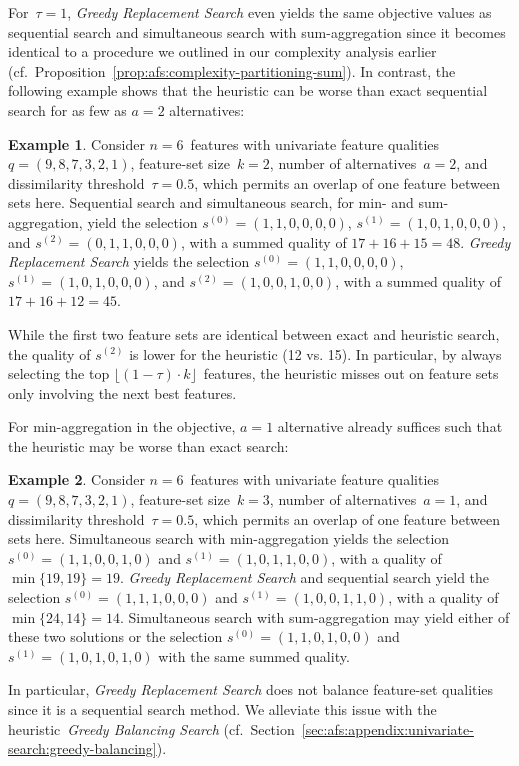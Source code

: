 \documentclass{article}
\theoremstyle{definition}
\newtheorem{example}{Example}
\begin{document}
%
For~$\tau = 1$, \emph{Greedy Replacement Search} even yields the same objective values as sequential search and simultaneous search with sum-aggregation since it becomes identical to a procedure we outlined in our complexity analysis earlier (cf.~Proposition~\ref{prop:afs:complexity-partitioning-sum}).
In contrast, the following example shows that the heuristic can be worse than exact sequential search for as few as $a=2$ alternatives:
%
\begin{example}
Consider $n=6$~features with univariate feature qualities $q = (9,8,7,3,2,1)$, feature-set size~$k=2$, number of alternatives~$a=2$, and dissimilarity threshold~$\tau = 0.5$, which permits an overlap of one feature between sets here.
Sequential search and simultaneous search, for min- and sum-aggregation, yield the selection $s^{(0)} = (1,1,0,0,0,0)$, $s^{(1)} = (1,0,1,0,0,0)$, and $s^{(2)} = (0,1,1,0,0,0)$, with a summed quality of $17+16+15=48$.
\emph{Greedy Replacement Search} yields the selection $s^{(0)} = (1,1,0,0,0,0)$, $s^{(1)} = (1,0,1,0,0,0)$, and $s^{(2)} = (1,0,0,1,0,0)$, with a summed quality of $17+16+12=45$.
\label{ex:afs:greedy-replacement:worse-than-sum-agg}
\end{example}
%
While the first two feature sets are identical between exact and heuristic search, the quality of $s^{(2)}$ is lower for the heuristic (12 vs. 15).
In particular, by always selecting the top $\lfloor (1 - \tau) \cdot k \rfloor$~features, the heuristic misses out on feature sets only involving the next best features.

For min-aggregation in the objective, $a=1$ alternative already suffices such that the heuristic may be worse than exact search:
%
\begin{example}
Consider $n=6$~features with univariate feature qualities $q = (9,8,7,3,2,1)$, feature-set size~$k=3$, number of alternatives~$a=1$, and dissimilarity threshold~$\tau = 0.5$, which permits an overlap of one feature between sets here.
Simultaneous search with min-aggregation yields the selection $s^{(0)} = (1,1,0,0,1,0)$ and $s^{(1)} = (1,0,1,1,0,0)$, with a quality of $\min \{19,19\} = 19$.
\emph{Greedy Replacement Search} and sequential search yield the selection $s^{(0)} = (1,1,1,0,0,0)$ and $s^{(1)} = (1,0,0,1,1,0)$, with a quality of $\min \{24,14\} = 14$.
Simultaneous search with sum-aggregation may yield either of these two solutions or the selection $s^{(0)} = (1,1,0,1,0,0)$ and $s^{(1)} = (1,0,1,0,1,0)$ with the same summed quality.
\label{ex:afs:greedy-replacement:worse-than-min-agg}
\end{example}
%
In particular, \emph{Greedy Replacement Search} does not balance feature-set qualities since it is a sequential search method.
We alleviate this issue with the heuristic~\emph{Greedy Balancing Search} (cf.~Section~\ref{sec:afs:appendix:univariate-search:greedy-balancing}).
\end{document}
